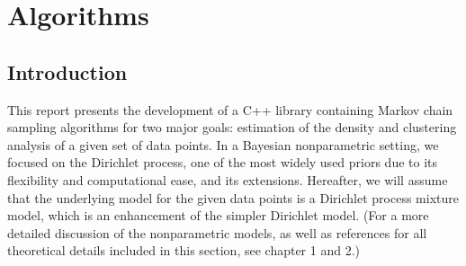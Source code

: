 \part{Algorithms}

\chapter{Introduction}
This report presents the development of a C++ library containing Markov chain sampling algorithms for two major goals: estimation of the density and clustering analysis of a given set of data points.
In a Bayesian nonparametric setting, we focused on the Dirichlet process, one of the most widely used priors due to its flexibility and computational ease, and its extensions.
Hereafter, we will assume that the underlying model for the given data points is a Dirichlet process mixture model, which is an enhancement of the simpler Dirichlet model.
(For a more detailed discussion of the nonparametric models, as well as references for all theoretical details included in this section, see \cite{book} chapter 1 and 2.)


